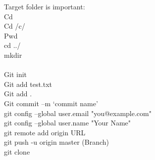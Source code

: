 \documentclass[12pt]{article}
\begin{document}
Target folder is important:\\
Cd\\
Cd /c/\\
Pwd\\
cd ../\\
mkdir\\
\\
Git init\\
Git add test.txt\\
Git add .\\
Git commit –m ‘commit name’\\
git config --global user.email "you@example.com"\\
git config --global user.name "Your Name"\\
git remote add origin URL\\
git push -u origin master (Branch)\\
git clone 
\end{document}
